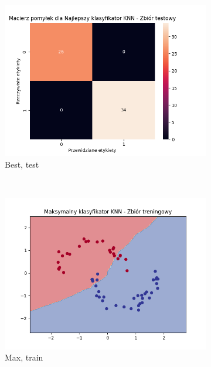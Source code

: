 \documentclass[12pt]{article}
\newcommand*{\subfigwidth}{0.24\textwidth}
\begin{document}
\begin{figure}[H]
\begin{subfigure}[t]{\subfigwidth}
        \includegraphics[width=\linewidth]{img/exp_3/knn/2_2/best/test_matrix.png}
        \caption{Best, test}
    \end{subfigure} 
    \\
    \begin{subfigure}[t]{\subfigwidth}
        \includegraphics[width=\linewidth]{img/exp_3/knn/2_2/max/train_boundary.png}
        \caption{Max, train}
    \end{subfigure}
    \hfill
    \begin{subfigure}[t]{\subfigwidth}

\end{subfigure}
\end{figure}
\end{document}
